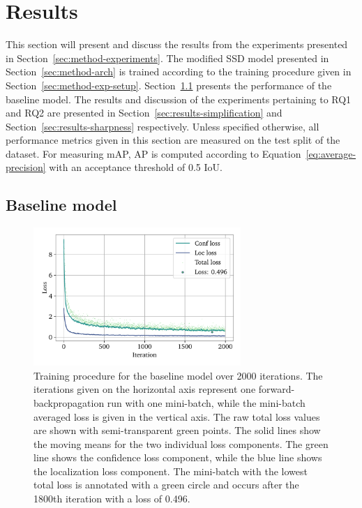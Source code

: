 \chapter{Results}\label{cha:results}

This section will present and discuss the results from the experiments presented in Section~\ref{sec:method-experiments}.
The modified SSD model presented in Section~\ref{sec:method-arch} is trained according to the training procedure given in Section~\ref{sec:method-exp-setup}.
Section~\ref{sec:results-baseline} presents the performance of the baseline model.
The results and discussion of the experiments pertaining to RQ1 and RQ2 are presented in Section~\ref{sec:results-simplification} and Section~\ref{sec:results-sharpness} respectively.
Unless specified otherwise, all performance metrics given in this section are measured on the test split of the dataset.
For measuring mAP, AP is computed according to Equation~\ref{eq:average-precision} with an acceptance threshold of 0.5 IoU.

\section{Baseline model}\label{sec:results-baseline}
\begin{figure}[htbp]
    \centering
    \includegraphics[width=0.7\textwidth]{figs/results/baseline/loss2.pdf}
    \caption[Baseline training procedure]{%
Training procedure for the baseline model over 2000 iterations.
The iterations given on the horizontal axis represent one forward-backpropagation run with one mini-batch, while the mini-batch averaged loss is given in the vertical axis.
The raw total loss values are shown with semi-transparent green points.
The solid lines show the moving means for the two individual loss components.
The green line shows the confidence loss component, while the blue line shows the localization loss component.
The mini-batch with the lowest total loss is annotated with a green circle and occurs after the 1800th iteration with a loss of 0.496.
    }\label{fig:method-baseline-loss}
  \end{figure}

